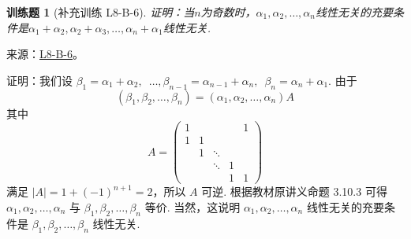 \documentclass[UTF8,12pt,a4paper,fontset=fandol]{ctexart}
\newtheorem{exercise}{训练题}[section]
\begin{document}
\begin{exercise}[补充训练 L8-B-6]\label{prob:L8-B-6}
证明：当$n$为奇数时，$\alpha_1,\alpha_2,\ldots,\alpha_n$线性无关的充要条件是$\alpha_1+\alpha_2,\alpha_2+\alpha_3,\ldots,\alpha_n+\alpha_1$线性无关.
\end{exercise}
\noindent 来源：\href{https://github.com/yhwu-is/Linear-Algebra-Left-Undone/blob/new/%E8%AE%B2%E4%B9%89/%E4%B8%93%E9%A2%98/8%20%E7%9B%B8%E6%8A%B5%E6%A0%87%E5%87%86%E5%BD%A2.tex}{L8-B-6}。
\begin{solve}
证明：我们设 $ \beta_1 = \alpha_1 + \alpha_2,\enspace \ldots, \beta_{n - 1} = \alpha_{n - 1} + \alpha_n,\enspace \beta_n = \alpha_n + \alpha_1 $. 由于
            \[ (\beta_1, \beta_2, \ldots, \beta_n) = (\alpha_1, \alpha_2, \ldots, \alpha_n) A \]
            其中
            \[ A = \begin{pmatrix}
                    1 &   &        &   & 1 \\
                    1 & 1 &        &   &   \\
                        & 1 & \ddots &   &   \\
                        &   & \ddots & 1 &   \\
                        &   &        & 1 & 1
                \end{pmatrix} \]
            满足 $ |A| = 1 + (-1)^{n + 1} = 2 $，所以 $ A $ 可逆. 根据教材原讲义命题 3.10.3 可得 $ \alpha_1, \alpha_2, \ldots, \alpha_n $ 与 $ \beta_1, \beta_2, \ldots, \beta_n $ 等价. 当然，这说明 $ \alpha_1, \alpha_2, \ldots, \alpha_n $ 线性无关的充要条件是 $ \beta_1, \beta_2, \ldots, \beta_n $ 线性无关.
\end{solve}
\end{document}
